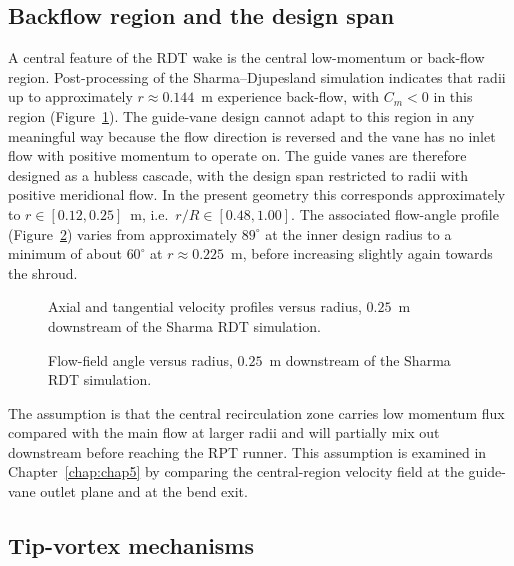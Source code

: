 \subsection{Backflow region and the design span}
\label{sec:theory_backflow_span}
 
A central feature of the RDT wake is the central low-momentum or back-flow region. Post-processing of the Sharma--Djupesland simulation indicates that radii up to approximately $r \approx 0.144$~m experience back-flow, with $C_m < 0$ in this region (Figure~\ref{fig:UxUt}). The guide-vane design cannot adapt to this region in any meaningful way because the flow direction is reversed and the vane has no inlet flow with positive momentum to operate on. The guide vanes are therefore designed as a hubless cascade, with the design span restricted to radii with positive meridional flow. In the present geometry this corresponds approximately to $r \in [0.12, 0.25]$~m, i.e.\ $r/R \in [0.48, 1.00]$. The associated flow-angle profile (Figure~\ref{fig:AngleRadius}) varies from approximately $89^\circ$ at the inner design radius to a minimum of about $60^\circ$ at $r \approx 0.225$~m, before increasing slightly again towards the shroud.
 
\begin{figure}[h!]
    \centering
    
    \caption[Axial and tangential velocity, Sharma's simulation]{Axial and tangential velocity profiles versus radius, $0.25$~m downstream of the Sharma RDT simulation.}
    \label{fig:UxUt}
\end{figure}
\begin{figure}[h!]
    \centering
    
    \caption[Flow-field angle, Sharma's simulation]{Flow-field angle versus radius, $0.25$~m downstream of the Sharma RDT simulation.}
    \label{fig:AngleRadius}
\end{figure}
 
The assumption is that the central recirculation zone carries low momentum flux compared with the main flow at larger radii and will partially mix out downstream before reaching the RPT runner. This assumption is examined in Chapter~\ref{chap:chap5} by comparing the central-region velocity field at the guide-vane outlet plane and at the bend exit.
 
\subsection{Tip-vortex mechanisms}
\label{sec:theory_tip_vortex}
 
